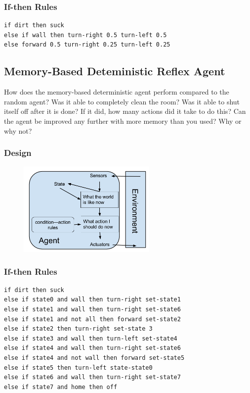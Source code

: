 \documentclass[a4paper,10pt]{article}
\begin{document}
\subsubsection{If-then Rules}
\begin{verbatim}
if dirt then suck
else if wall then turn-right 0.5 turn-left 0.5
else forward 0.5 turn-right 0.25 turn-left 0.25
\end{verbatim}


\subsection{Memory-Based Deteministic Reflex Agent}
How does the memory-based deterministic agent perform compared to the random agent? Was it able to completely clean the room? Was it able to shut itself off after it is done? If it did, how many actions did it take to do this? Can the agent be improved any further with more memory than you used? Why or why not?
\subsubsection{Design}
\begin{figure}[H]
	\begin{center}
		\includegraphics[width=0.6\textwidth]{MemoryReflex.png}
	\end{center}
\end{figure}
\subsubsection{If-then Rules}
\begin{verbatim}
if dirt then suck
else if state0 and wall then turn-right set-state1
else if state1 and wall then turn-right set-state6
else if state1 and not all then forward set-state2
else if state2 then turn-right set-state 3
else if state3 and wall then turn-left set-state4
else if state4 and wall then turn-right set-state6
else if state4 and not wall then forward set-state5
else if state5 then turn-left state-state0
else if state6 and wall then turn-right set-state7
else if state7 and home then off
\end{verbatim}
\end{document}
